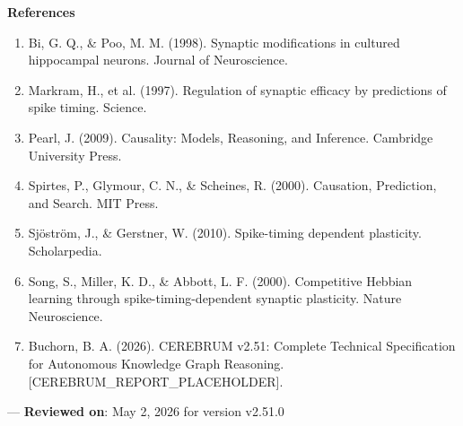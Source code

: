\textbf{References}
\begin{enumerate}
\item Bi, G. Q., \& Poo, M. M. (1998). Synaptic modif\-ications in cultured hippocampal neurons. Journal of Neuros\-cience.
\item Markram, H., et al. (1997). Regulation of synaptic efficacy by predictions of spike timing. Science.
\item Pearl, J. (2009). Causality: Models, Reasoning, and Inference. Cambridge University Press.
\item Spirtes, P., Glymour, C. N., \& Scheines, R. (2000). Causation, Prediction, and Search. MIT Press.
\item Sjöström, J., \& Gerstner, W. (2010). Spike-timing dependent plasticity. Schola\-rpedia.
\item Song, S., Miller, K. D., \& Abbott, L. F. (2000). Competitive Hebbian learning through spike-timing-dependent synaptic plasticity. Nature Neuros\-cience.
\item Buchorn, B. A. (2026). CEREBRUM v2.51: Complete Technical Specif\-ication for Autonomous Knowledge Graph Reasoning. [CEREBRUM\_REPORT\_PLACEHOLDER].

\end{enumerate}
---
\textbf{Reviewed on}: May 2, 2026 for version v2.51.0
